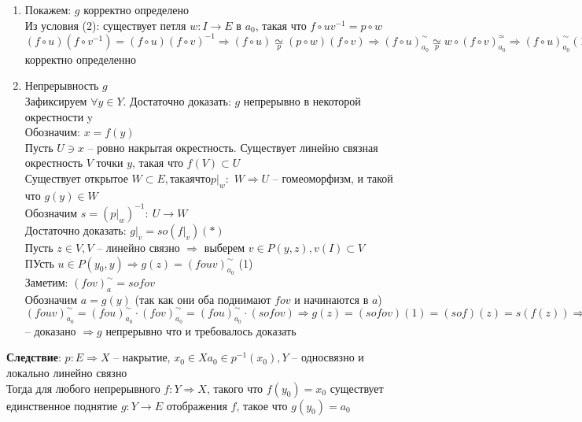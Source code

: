 	\begin{enumerate}
		\item Покажем: $g$ корректно определено\\
		Из условия (2): существует петля $w: I\rightarrow E$ в $a_0$, такая что $f \circ uv^{-1} = p \circ w$\\
		$(f \circ u)(f \circ v^{-1}) = (f \circ u)(f \circ v)^{-1} \Rightarrow (f \circ u) \underset{p}{\simeq} (p \circ w)(f \circ v) \Rightarrow (f \circ u)_{a_0}^{\sim} \underset{p}{\simeq} w \circ (f \circ v)_{a_0}^{\simeq} \Rightarrow (f \circ u)_{a_0}^{\sim} (1) = (f \circ v)_{a_0}^{\sim} (1) \Rightarrow g$ корректно определенно
		\item Непрерывность $g$\\
		Зафиксируем $\forall y\in Y$. Достаточно доказать: $g$ непрерывно в некоторой окрестности y\\
		Обозначим: $x = f(y)$\\
		Пусть $U\ni x$ -- ровно накрытая окрестность. Существует линейно связная окрестность $V$ точки $y$, такая что $f(V)\subset U$\\
		Существует открытое $W\subset E, такая что {p|}_w$:\ $W\Rightarrow U$ -- гомеоморфизм, и такой что $g(y) \in W$\\
		Обозначим $s = ({p|}_w)^{-1}:\ U \rightarrow W$\\
		Достаточно доказать: ${g|}_v = so({f|}_v) (*)$\\
		Пусть $z\in V, V$ -- линейно связно $\Rightarrow$ выберем $v\in P(y,z), v(I) \subset V$\\
		ПУсть $u\in P(y_0,y) \Rightarrow g(z) = (fouv)_{a_0}^{\sim}$ (1)\\
		Заметим: $(fov)_{a}^{\sim} = sofov$\\
		Обозначим $a = g(y)$ (так как они оба поднимают $fov$ и начинаются в $a$)\\
		$(fouv)_{a_0}^{\sim} = (fou)_{a_0}^{\sim} \cdot (fov)_{a_0}^{\sim} = (fou)_{a_0}^{\sim} \cdot (sofov) \Rightarrow g(z) = (sofov) (1) = (sof)(z) = s(f(z)) \Rightarrow (*)$ -- доказано $\Rightarrow g$ непрерывно что и требовалось доказать
	\end{enumerate}
	\textbf{Следствие}: $p: E\Rightarrow X$ -- накрытие, $x_0 \in X a_0 \in p^{-1} (x_0), Y$ -- односвязно и локально линейно связно\\
	Тогда для любого непрерывного $f: Y \Rightarrow X$, такого что $f(y_0) = x_0$ существует единственное поднятие $g: Y \rightarrow E$ отображения $f$, такое что $g(y_0) = a_0$


